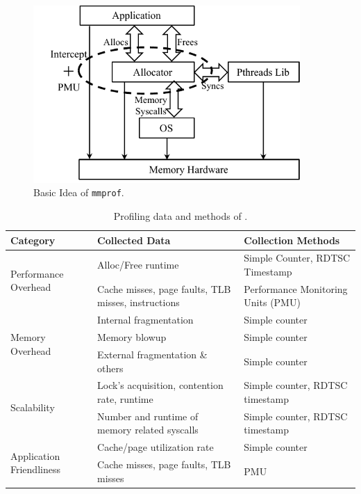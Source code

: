 \begin{figure}[!ht]
\centering
\includegraphics[width=4in]{figures/overview}
\caption{Basic Idea of \texttt{mmprof}.\label{fig:basicidea}}
\end{figure}


\begin{table}[h]
  \centering
  \footnotesize
\begin{tabular}{l | l | l}
\hline
Category & Collected Data & Collection Methods \\ \hline
\multirow{2}{*}{Performance Overhead} & {Alloc/Free runtime} & Simple Counter, RDTSC Timestamp\\ \cline{2-3}
& {Cache misses, page faults, TLB misses, instructions} & Performance Monitoring Units (PMU) \\ \hline
\multirow{3}{*}{Memory Overhead} & Internal fragmentation & Simple counter\\ \cline{2-3}
	& Memory blowup & Simple counter \\ \cline{2-3}
& {External fragmentation \& others} & Simple counter \\ \hline
\multirow{2}{*}{Scalability} & Lock's acquisition, contention rate, runtime & Simple counter, RDTSC timestamp\\ \cline{2-3}
& {Number and runtime of memory related syscalls} & Simple counter, RDTSC timestamp \\ \hline
\multirow{2}{*}{Application Friendliness} & Cache/page utilization rate & Simple counter \\ \cline{2-3}
& Cache misses, page faults, TLB misses & PMU\\ \hline
  \end{tabular}
  \centering
  \caption{Profiling data and methods of \MP{}.\label{table:alldata}}
\end{table}

